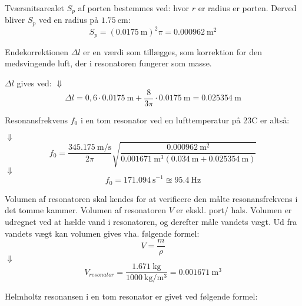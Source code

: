 Tværsnitsarealet $S_{p}$ af porten bestemmes ved: 
\Sp 
hvor ${r}$ er radius er porten. 
Derved bliver $S_{p}$ ved en radius på ${\SI{1.75}{\centi \meter}}$:  
\begin{equation}
S_{p} = ({\SI{0,0175}{\meter}})^{2}\pi = {\SI{0,000962}{\meter^{2}}}	
\end{equation}  

Endekorrektionen $\Delta l$ er en værdi som tillægges, som korrektion for den medsvingende luft, der i resonatoren fungerer som masse. 

$\Delta l$ gives ved: \deltal
$\Downarrow$
\begin{equation}
		\Delta l = 0,6 \cdot {\SI{0,0175}{\meter}} + \frac{8}{3\pi} \cdot {\SI{0,0175}{\meter}} = {\SI{0,025354}{\meter}} 
\end{equation}

Resonansfrekvens $f_{0}$ i en tom resonator ved en lufttemperatur på 23\degree C er altså:

\fnul
$\Downarrow$   
\begin{equation}
		f_{0} = \frac{\SI{345,175}{\meter / \second}}{2\pi}\sqrt{\frac{\SI{0,000962}{\meter^{2}}}{{\SI{0,001671}{\meter^{3}}}({\SI{0,034}{\meter}}+{\SI{0,025354}{\meter}})}} 
	\end{equation}	
$\Downarrow$
\begin{equation}
	f_{0} = {\SI{171,094}{\second}^{-1}} \approxeq {\SI{95,4}{\hertz}} 	
	\end{equation}
	




Volumen af resonatoren skal kendes for at verificere den målte resonansfrekvens i det tomme kammer. 
Volumen af resonatoren $V$ er ekskl. port/ hals. Volumen er udregnet ved at hælde vand i resonatoren, og derefter måle vandets vægt. Ud fra vandets vægt kan volumen gives vha. følgende formel:  
\begin{equation}
  V=\frac{m}{\rho}
  \label{eq:vformel}
\end{equation}
$\Downarrow$
\begin{equation}
V_{resonator}=\frac{\SI{1,671}{\kilo\gram}}{\SI{1000}{\kilo \gram \per \meter^{3}}}={\SI{0,001671}{\meter^{3}}}
\end{equation}


Helmholtz resonansen i en tom resonator er givet ved følgende formel: \fnul

